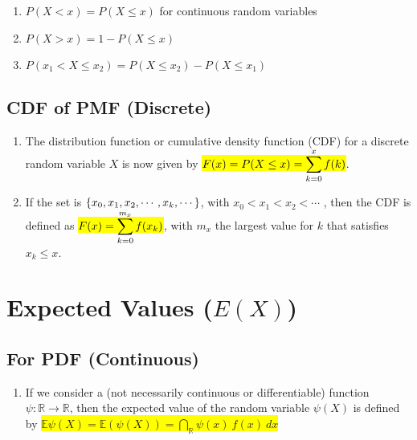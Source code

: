 \begin{enumerate}
    \item $P(X < x) = P(X \leq x)$ for continuous random variables

    \item $P(X > x) = 1 - P(X \leq x)$
    \hfill \cite{statistics/book/Statistics-for-Data-Scientists/Maurits-Kaptein}

    \item $P( x_1 < X \leq x_2) = P(X \leq x_2) - P(X \leq x_1)$
    \hfill \cite{statistics/book/Statistics-for-Data-Scientists/Maurits-Kaptein}
\end{enumerate}



\subsection{CDF of PMF (Discrete)}

\begin{enumerate}
    \item The distribution function or cumulative density function (CDF) for a discrete random variable $X$ is now given by \colorbox{yellow}{$F(x) = P(X \leq x) = \displaystyle\sum^{x}_ {k=0} f (k)$}.
    \hfill \cite{statistics/book/Statistics-for-Data-Scientists/Maurits-Kaptein}

    \item If the set is $\left\{x_0, x_1, x_2, \cdots , x _k , \cdots\right\}$, with $x_0 < x_1 < x_2 < \cdots$ , then the CDF is defined as \colorbox{yellow}{$F(x) =\displaystyle\sum^{m_x} _{k=0} f (x _k )$}, with $m _x$ the largest value for $k$ that satisfies $x_ k \leq x$.
    \hfill \cite{statistics/book/Statistics-for-Data-Scientists/Maurits-Kaptein}
\end{enumerate}




\section{Expected Values ($E(X)$)}

\subsection{For PDF (Continuous)}

\begin{enumerate}
    \item If we consider a (not necessarily continuous or differentiable) function $\psi : \mathbb{R} \to \mathbb{R}$, then the expected value of the random variable $\psi (X)$ is defined by
    \colorbox{yellow}{$
        \mathbb{E}\psi(X) 
        = \mathbb{E}(\psi(X))
        = \dint_{\mathbb{R}} \psi(x)\ f(x)\ dx
    $}
    \hfill \cite{statistics/book/Statistics-for-Data-Scientists/Maurits-Kaptein}
\end{enumerate}

